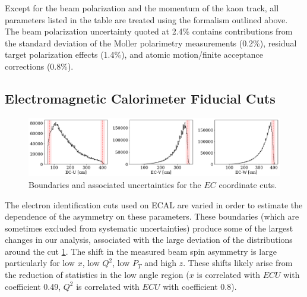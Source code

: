 Except for the beam polarization and the momentum of the kaon track, all parameters listed in the table are treated using the formalism outlined above.  The beam polarization uncertainty quoted at 2.4\% contains contributions from the standard deviation of the Moller polarimetry measurements (0.2\%), residual target polarization effects (1.4\%), and atomic motion/finite acceptance corrections (0.8\%).\\

\subsection{Electromagnetic Calorimeter Fiducial Cuts}

\begin{figure}
	\label{fig:ec_fid_sys}
	\begin{center}
		\includegraphics[width=\textwidth]{image/plots/kaon-bsa/ec-fid-sys.pdf}
		\caption{Boundaries and associated uncertainties for the $EC$ coordinate cuts.}
	\end{center}
\end{figure}

The electron identification cuts used on ECAL are varied in order to estimate the dependence of the asymmetry on these parameters.  These boundaries (which are sometimes excluded from systematic uncertainties) produce some of the largest changes in our analysis, associated with the large deviation of the distributions around the cut \ref{fig:ec_fid_sys}.  The shift in the measured beam spin asymmetry is large particularly for low $x$, low $Q^2$, low $P_T$ and high $z$.  These shifts likely arise from the reduction of statistics in the low angle region ($x$ is correlated with $ECU$ with coefficient 0.49, $Q^2$ is correlated with $ECU$ with coefficient 0.8).   

